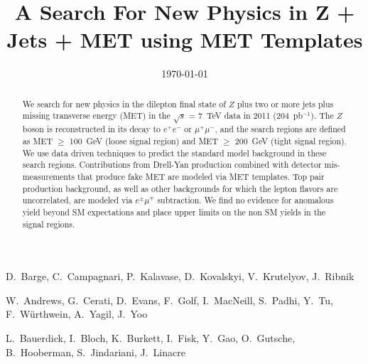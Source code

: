 \documentclass{cmspaper}
\newcommand{\Z}{$Z$ } %
\newcommand{\lumi}{204~pb$^{-1}$}
\newcommand{\signalmetl}{100}
\newcommand{\signalmett}{200}
\begin{document}
\begin{titlepage}


  \date{\today}
 
  \title{A Search For New Physics in Z + Jets + MET using MET Templates}

  \begin{Authlist}
    D.~Barge, C.~Campagnari, P.~Kalavase, D.~Kovalskyi, V.~Krutelyov, J.~Ribnik

    W.~Andrews, G.~Cerati, D.~Evans, F.~Golf, I.~MacNeill, S.~Padhi, Y.~Tu, F.~W\"urthwein, 
	A.~Yagil, J.~Yoo

	L.~Bauerdick, I.~Bloch, K.~Burkett, I.~Fisk, Y.~Gao, O.~Gutsche, B.~Hooberman, 
	S.~Jindariani, J.~Linacre
  \end{Authlist}

  \begin{abstract}

\begin{comment}

We search for new physics in the dilepton final state of Z plus two or more jets plus missing transverse 
energy (MET) in the $\sqrt{s}$ = 7~TeV data in 2011 (204~pb$^{-1}$). 
The Z boson is reconstructed in its decay to $e^+e^-$ or $\mu^+\mu^-$, and
the search regions are defined as MET $\ge$ 100 GeV (loose signal region) and 
MET $\ge$ 200 GeV (tight signal region). 
We use data driven techniques to predict the standard model background in these
search regions. 
Contributions from Drell-Yan production combined with detector mis-measurements that produce 
fake MET are modeled via MET templates.
Top pair production background, as well as other backgrounds for which the lepton
flavors are uncorrelated, are modeled via $e^\pm\mu^\mp$ subtraction.
We find no evidence
for anomalous yield beyond SM expectations and place upper limits
on the non SM yields in the signal regions.

\end{comment}


We search for new physics in the dilepton final state of \Z plus two or more jets plus missing transverse 
energy (MET) in the $\sqrt{s}$ = 7~TeV data in 2011 (\lumi). 
The \Z boson is reconstructed in its decay to $e^+e^-$ or $\mu^+\mu^-$, and
the search regions are defined as MET $\ge$ \signalmetl~GeV (loose signal region) and 
MET $\ge$ \signalmett~GeV (tight signal region). 
We use data driven techniques to predict the standard model background in these
search regions. 
Contributions from Drell-Yan production combined with detector mis-measurements that produce 
fake MET are modeled via MET templates.
Top pair production background, as well as other backgrounds for which the lepton
flavors are uncorrelated, are modeled via $e^\pm\mu^\mp$ subtraction.
We find no evidence
for anomalous yield beyond SM expectations and place upper limits
on the non SM yields in the signal regions.



\end{abstract}
\end{titlepage}
\end{document}
